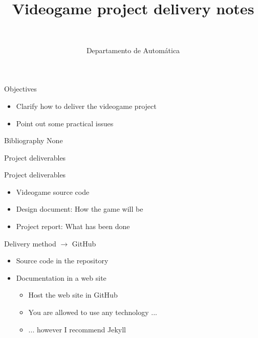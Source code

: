 \documentclass[10pt,compress]{beamer} %
\title[Videogame delivery notes]{Videogame project delivery notes}
\author{\asignatura\\\carrera}
\institute{}
\date{Departamento de Automática}
\begin{document}
{\titlepageBlue
    \begin{frame}
        \titlepage
    \end{frame}
}

\begin{frame}[plain]{}
   \begin{block}{Objectives}
   \begin{itemize}
        \item Clarify how to deliver the videogame project
		\item Point out some practical issues
	\end{itemize}
	\end{block}

   \begin{block}{Bibliography}
   		None
   \end{block}
\end{frame}



\begin{frame}{Project deliverables}
	\begin{block}{Project deliverables}
	\begin{itemize}
	\item Videogame source code
	\item Design document: How the game will be
	\item Project report: What has been done
	\end{itemize}
	\end{block}

	\bigskip
	
	Delivery method $\rightarrow$ GitHub
	\begin{itemize}
	\item Source code in the repository
	\item Documentation in a web site
		\begin{itemize}
		\item Host the web site in GitHub
		\item You are allowed to use any technology ...
		\item ... however I recommend Jekyll
		\end{itemize}
	\end{itemize}
\end{frame}
\end{document}
